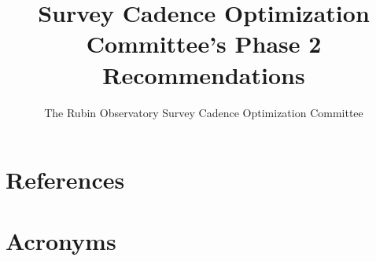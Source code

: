 \documentclass[PST,authoryear,toc]{lsstdoc}
\title{Survey Cadence Optimization Committee’s Phase 2 Recommendations}
\author{%
The Rubin Observatory Survey Cadence Optimization Committee}
\date{\vcsDate}
\begin{document}
\maketitle




\appendix
\section{References} \label{sec:bib}
\renewcommand{\refname}{} %


\section{Acronyms} \label{sec:acronyms}

\end{document}
